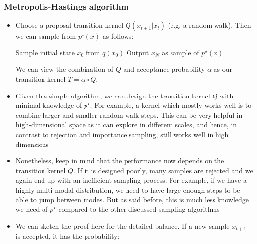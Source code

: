 \subsubsection{Metropolis-Hastings algorithm}
\begin{itemize}
	\item Choose a proposal transition kernel $Q(x_{t+1}|x_{t})$ (e.g. a random walk). Then we can sample from $p^{\star}(x)$ as follows:
	\begin{tcolorbox}[colback=white!80!gray,colframe=gray!75!black,title=Pseudocode for Metropolis-Hastings algorithm]
		\begin{algorithm}[H]
			\SetAlgoLined
			Sample initial state $x_0$ from $q(x_0)$\;
			Output $x_N$ as sample of $p^{\star}(x)$\;
		\end{algorithm}
	\end{tcolorbox}	
	We can view the combination of $Q$ and acceptance probability $\alpha$ as our transition kernel $T=\alpha\circ Q$.
	\item Given this simple algorithm, we can design the transition kernel $Q$ with minimal knowledge of $p^{\star}$. For example, a kernel which mostly works well is to combine larger and smaller random walk steps. This can be very helpful in high-dimensional space as it can explore in different scales, and hence, in contrast to rejection and importance sampling, still works well in high dimensions
	\item Nonetheless, keep in mind that the performance now depends on the transition kernel $Q$. If it is designed poorly, many samples are rejected and we again end up with an inefficient sampling process. For example, if we have a highly multi-modal distribution, we need to have large enough steps to be able to jump between modes. But as said before, this is much less knowledge we need of $p^{\star}$ compared to the other discussed sampling algorithms
	\item We can sketch the proof here for the detailed balance. If a new sample $x_{t+1}$ is accepted, it has the probability:
	\begin{equation*}

\end{equation*}
\end{itemize}
